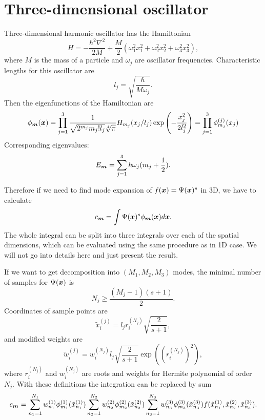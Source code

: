 \section{Three-dimensional oscillator}

Three-dimensional harmonic oscillator has the Hamiltonian
\[
	H = -\frac{\hbar^2 \nabla^2}{2 M}
		+ \frac{M}{2} (
			\omega_1^2 x_1^2 + \omega_2^2 x_2^2 + \omega_3^2 x_3^2
		),
\]
where $M$ is the mass of a particle and $\omega_j$ are oscillator frequencies.
Characteristic lengths for this oscillator are
\[
	l_j = \sqrt{\frac{\hbar}{M \omega_j}}.
\]
Then the eigenfunctions of the Hamiltonian are
\[
	\phi_{\boldsymbol{m}} (\boldsymbol{x})
	= \prod_{j=1}^3
		\frac{1}{\sqrt{2^{m_j} m_j! l_j} \sqrt[4]{\pi}} H_{m_j}(x_j / l_j)
		\exp \left( -\frac{x_j^2}{2 l_j^2} \right)
	= \prod_{j=1}^3 \phi_{m_j}^{(j)} (x_j)
\]
Corresponding eigenvalues:
\[
	E_{\boldsymbol{m}} = \sum_{j=1}^3 \hbar \omega_j (m_j + \frac{1}{2}).
\]

Therefore if we need to find mode expansion of $f(\boldsymbol{x}) = \Psi(\boldsymbol{x})^s$ in 3D, we have to calculate
\[
	c_{\boldsymbol{m}} = \int \Psi(\boldsymbol{x})^s \phi_{\boldsymbol{m}}(\boldsymbol{x}) d\boldsymbol{x}.
\]
The whole integral can be split into three integrals over each of the spatial dimensions,
which can be evaluated using the same procedure as in 1D case.
We will not go into details here and just present the result.

If we want to get decomposition into $(M_1, M_2, M_3)$ modes,
the minimal number of samples for $\Psi(\boldsymbol{x})$ is
\[
	N_j \ge \frac{(M_j - 1)(s + 1)}{2}.
\]
Coordinates of sample points are
\[
	\tilde{x}_{i}^{(j)} = l_j r_i^{(N_j)} \sqrt{\frac{2}{s+1}},
\]
and modified weights are
\[
	\tilde{w}_{i}^{(j)} = w_i^{(N_j)} l_j \sqrt{\frac{2}{s+1}} \exp((r_i^{(N_j)})^2),
\]
where $r_i^{(N_j)}$ and $w_i^{(N_j)}$ are roots and weights for Hermite polynomial of order $N_j$.
With these definitions the integration can be replaced by sum
\[
	c_{\boldsymbol{m}}
	= \sum_{n_1=1}^{N_1} w_{n_1}^{(1)} \phi_{m_1}^{(1)} (\tilde{x}_{n_1}^{(1)})
		\sum_{n_2=1}^{N_2} w_{n_2}^{(2)} \phi_{m_2}^{(2)} (\tilde{x}_{n_2}^{(2)})
		\sum_{n_3=1}^{N_3} w_{n_3}^{(3)} \phi_{m_3}^{(3)} (\tilde{x}_{n_3}^{(3)})
		f(\tilde{x}_{n_1}^{(1)}, \tilde{x}_{n_2}^{(2)}, \tilde{x}_{n_3}^{(3)}).
\]

